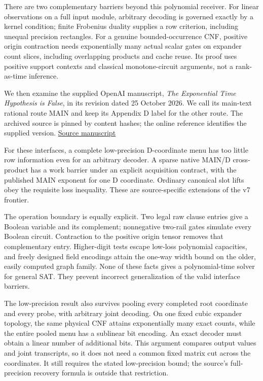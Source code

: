 \documentclass[11pt,a4paper]{article}
\begin{document}
There are two complementary barriers beyond this polynomial receiver.
For linear observations on a full input module, arbitrary decoding is
governed exactly by a kernel condition; finite Frobenius duality
supplies a row criterion, including unequal precision rectangles. For a
genuine bounded-occurrence CNF, positive origin contraction needs
exponentially many actual scalar gates on expander count slices,
including overlapping products and cache reuse. Its proof uses positive
support contexts and classical monotone-circuit arguments, not a
rank-as-time inference.

We then examine the supplied OpenAI manuscript, \emph{The Exponential
Time Hypothesis is False}, in its revision dated 25 October 2026. We
call its main-text rational route MAIN and keep its Appendix D label for
the other route. The archived source is pinned by content hashes; the
online reference identifies the supplied version.
\href{https://github.com/openai/math/tree/main/preprints/The-Exponential-Time-Hypothesis-is-False-October-25-2026}{Source
manuscript}

For these interfaces, a complete low-precision D-coordinate menu has too
little row information even for an arbitrary decoder. A sparse native
MAIN/D cross-product has a work barrier under an explicit acquisition
contract, with the published MAIN exponent for one D coordinate.
Ordinary canonical slot lifts obey the requisite loss inequality. These
are source-specific extensions of the v7 frontier.

The operation boundary is equally explicit. Two legal raw clause entries
give a Boolean variable and its complement; nonnegative two-rail gates
simulate every Boolean circuit. Contraction to the positive origin
tensor removes that complementary entry. Higher-digit tests escape
low-loss polynomial capacities, and freely designed field encodings
attain the one-way width bound on the older, easily computed graph
family. None of these facts gives a polynomial-time solver for general
SAT. They prevent incorrect generalization of the valid interface
barriers.

The low-precision result also survives pooling every completed root
coordinate and every probe, with arbitrary joint decoding. On one fixed
cubic expander topology, the same physical CNF attains exponentially
many exact counts, while the entire pooled menu has a sublinear bit
encoding. An exact decoder must obtain a linear number of additional
bits. This argument compares output values and joint transcripts, so it
does not need a common fixed matrix cut across the coordinates. It still
requires the stated low-precision bound; the source's full-precision
recovery formula is outside that restriction.
\end{document}
